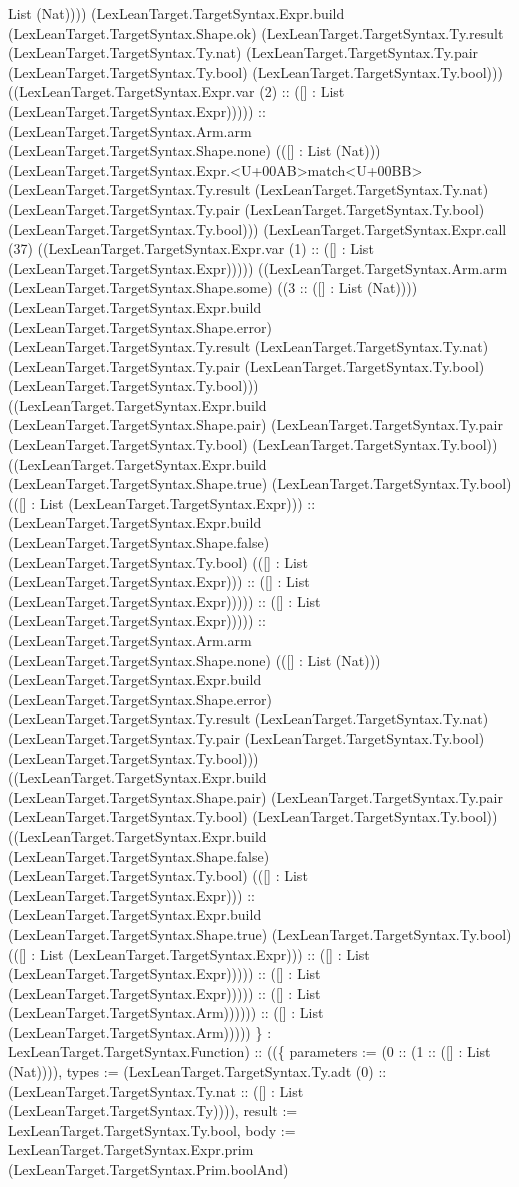 \documentclass[11pt]{article}
\begin{document}
List (Nat)))) (LexLeanTarget.TargetSyntax.Expr.build (LexLeanTarget.TargetSyntax.Shape.ok) (LexLeanTarget.TargetSyntax.Ty.result (LexLeanTarget.TargetSyntax.Ty.nat) (LexLeanTarget.TargetSyntax.Ty.pair (LexLeanTarget.TargetSyntax.Ty.bool) (LexLeanTarget.TargetSyntax.Ty.bool))) ((LexLeanTarget.TargetSyntax.Expr.var (2) :: ([] : List (LexLeanTarget.TargetSyntax.Expr))))) :: (LexLeanTarget.TargetSyntax.Arm.arm (LexLeanTarget.TargetSyntax.Shape.none) (([] : List (Nat))) (LexLeanTarget.TargetSyntax.Expr.<U+00AB>match<U+00BB> (LexLeanTarget.TargetSyntax.Ty.result (LexLeanTarget.TargetSyntax.Ty.nat) (LexLeanTarget.TargetSyntax.Ty.pair (LexLeanTarget.TargetSyntax.Ty.bool) (LexLeanTarget.TargetSyntax.Ty.bool))) (LexLeanTarget.TargetSyntax.Expr.call (37) ((LexLeanTarget.TargetSyntax.Expr.var (1) :: ([] : List (LexLeanTarget.TargetSyntax.Expr))))) ((LexLeanTarget.TargetSyntax.Arm.arm (LexLeanTarget.TargetSyntax.Shape.some) ((3 :: ([] : List (Nat)))) (LexLeanTarget.TargetSyntax.Expr.build (LexLeanTarget.TargetSyntax.Shape.error) (LexLeanTarget.TargetSyntax.Ty.result (LexLeanTarget.TargetSyntax.Ty.nat) (LexLeanTarget.TargetSyntax.Ty.pair (LexLeanTarget.TargetSyntax.Ty.bool) (LexLeanTarget.TargetSyntax.Ty.bool))) ((LexLeanTarget.TargetSyntax.Expr.build (LexLeanTarget.TargetSyntax.Shape.pair) (LexLeanTarget.TargetSyntax.Ty.pair (LexLeanTarget.TargetSyntax.Ty.bool) (LexLeanTarget.TargetSyntax.Ty.bool)) ((LexLeanTarget.TargetSyntax.Expr.build (LexLeanTarget.TargetSyntax.Shape.true) (LexLeanTarget.TargetSyntax.Ty.bool) (([] : List (LexLeanTarget.TargetSyntax.Expr))) :: (LexLeanTarget.TargetSyntax.Expr.build (LexLeanTarget.TargetSyntax.Shape.false) (LexLeanTarget.TargetSyntax.Ty.bool) (([] : List (LexLeanTarget.TargetSyntax.Expr))) :: ([] : List (LexLeanTarget.TargetSyntax.Expr))))) :: ([] : List (LexLeanTarget.TargetSyntax.Expr))))) :: (LexLeanTarget.TargetSyntax.Arm.arm (LexLeanTarget.TargetSyntax.Shape.none) (([] : List (Nat))) (LexLeanTarget.TargetSyntax.Expr.build (LexLeanTarget.TargetSyntax.Shape.error) (LexLeanTarget.TargetSyntax.Ty.result (LexLeanTarget.TargetSyntax.Ty.nat) (LexLeanTarget.TargetSyntax.Ty.pair (LexLeanTarget.TargetSyntax.Ty.bool) (LexLeanTarget.TargetSyntax.Ty.bool))) ((LexLeanTarget.TargetSyntax.Expr.build (LexLeanTarget.TargetSyntax.Shape.pair) (LexLeanTarget.TargetSyntax.Ty.pair (LexLeanTarget.TargetSyntax.Ty.bool) (LexLeanTarget.TargetSyntax.Ty.bool)) ((LexLeanTarget.TargetSyntax.Expr.build (LexLeanTarget.TargetSyntax.Shape.false) (LexLeanTarget.TargetSyntax.Ty.bool) (([] : List (LexLeanTarget.TargetSyntax.Expr))) :: (LexLeanTarget.TargetSyntax.Expr.build (LexLeanTarget.TargetSyntax.Shape.true) (LexLeanTarget.TargetSyntax.Ty.bool) (([] : List (LexLeanTarget.TargetSyntax.Expr))) :: ([] : List (LexLeanTarget.TargetSyntax.Expr))))) :: ([] : List (LexLeanTarget.TargetSyntax.Expr))))) :: ([] : List (LexLeanTarget.TargetSyntax.Arm)))))) :: ([] : List (LexLeanTarget.TargetSyntax.Arm))))) \} : LexLeanTarget.TargetSyntax.Function) :: ((\{ parameters := (0 :: (1 :: ([] : List (Nat)))), types := (LexLeanTarget.TargetSyntax.Ty.adt (0) :: (LexLeanTarget.TargetSyntax.Ty.nat :: ([] : List (LexLeanTarget.TargetSyntax.Ty)))), result := LexLeanTarget.TargetSyntax.Ty.bool, body := LexLeanTarget.TargetSyntax.Expr.prim (LexLeanTarget.TargetSyntax.Prim.boolAnd) 
\end{document}
